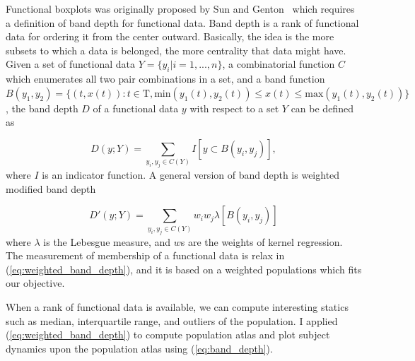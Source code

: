 Functional boxplots was originally proposed by Sun and Genton~\cite{sun2011functional} which requires a definition of band depth for functional data.
Band depth is a rank of functional data for ordering it from the center outward. 
Basically, the idea is the more subsets to which a data is belonged, the more centrality that data might have.
Given a set of functional data $Y=\{y_i | i=1,...,n\}$, a combinatorial function $C$ which enumerates all two pair combinations in a set, and a band function $B(y_1, y_2) = \{(t,x(t)): t\in \mathrm{T}, \mathrm{min}(y_1(t),y_2(t)) \leq x(t) \leq \mathrm{max}(y_1(t),y_2(t))\}$,
the band depth $D$ of a functional data $y$ with respect to a set $Y$ can be defined as

\begin{equation}
D(y; Y) = \sum_{y_i, y_j \in C(Y)} I[y \subset B(y_i, y_j)],
\label{eq:band_depth}
\end{equation}
where $I$ is an indicator function.
A general version of band depth is weighted modified band depth

\begin{equation}
D'(y; Y) = \sum_{y_i, y_j \in C(Y)} w_iw_j\lambda[ B(y_i, y_j) ]
\label{eq:weighted_band_depth}
\end{equation}
where $\lambda$ is the Lebesgue measure, and $w$s are the weights of kernel regression.
The measurement of membership of a functional data is relax in 
(\ref{eq:weighted_band_depth}), and it is based on a weighted populations which fits our objective.

When a rank of functional data is available, we can compute interesting statics such as median, interquartile range, and outliers of the population.
I applied (\ref{eq:weighted_band_depth}) to compute population atlas and plot subject dynamics upon the population atlas using (\ref{eq:band_depth}).

